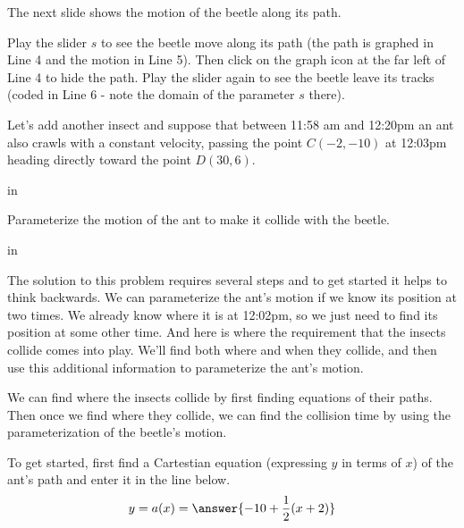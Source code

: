 \documentclass{ximera}
\newcommand{\pskip}{\vskip 0.1 in}
\begin{document}
The next slide shows the motion of the beetle along its path.

\begin{exploration}\label{exp:pc1b}
Play the slider $s$ to see the beetle move along its path (the path is graphed in Line 4 and the motion in Line 5). Then click on the graph icon at the far left of Line 4 to hide the path. Play the slider again to see the beetle leave its tracks (coded in Line 6 - note the domain of the parameter $s$ there).
 
 
\begin{onlineOnly}
    \begin{center}
\end{center}
\end{onlineOnly}
\end{exploration}


Let's add another insect and suppose that between 11:58 am and 12:20pm an ant also crawls with a constant velocity, passing the point $C(-2,-10)$ at 12:03pm heading directly toward the point $D(30,6)$.

\pskip

 Parameterize the motion of the ant to make it collide with the beetle.

\pskip

 The solution to this problem requires several steps and to get started it helps to think backwards. We can parameterize the ant's motion if we know its position at two times. We already know where it is at 12:02pm, so we just need to find its position at some other time. And here is where the requirement that the insects collide comes into play. We'll find both where and when they collide, and then use this additional information to parameterize the ant's motion.

We can find where the insects collide by first finding equations of their paths. Then once we find where they collide, we can find the collision time by using the parameterization of the beetle's motion.


\begin{question}  
To get started, first find a Cartestian equation (expressing $y$ in terms of $x$) of the ant's path and enter it in the line below.
 \[
     y=a(x) =  \answer{-10+\frac{1}{2}(x+2)}
\] 
   \end{question}
\end{document}
